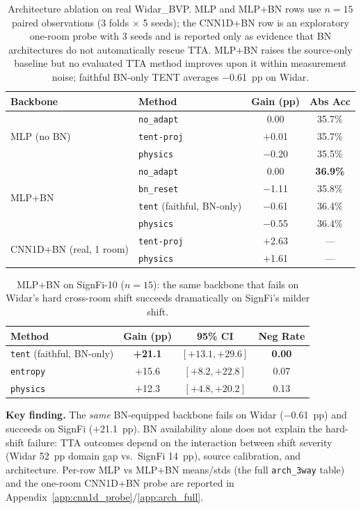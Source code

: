 \begin{table}[h]
\centering
\caption{Architecture ablation on real Widar\_BVP. MLP and MLP+BN rows use $n{=}15$ paired observations (3 folds $\times$ 5 seeds); the CNN1D+BN row is an exploratory one-room probe with 3 seeds and is reported only as evidence that BN architectures do not automatically rescue TTA. MLP+BN raises the source-only baseline but no evaluated TTA method improves upon it within measurement noise; faithful BN-only TENT averages $-$0.61~pp on Widar.}
\label{tab:faithful_tent}
\small
\begin{tabular}{llcc}
\toprule
\textbf{Backbone} & \textbf{Method} & \textbf{Gain (pp)} & \textbf{Abs Acc} \\
\midrule
\multirow{3}{*}{MLP (no BN)} & \texttt{no\_adapt} & 0.00 & 35.7\% \\
 & \texttt{tent-proj} & $+$0.01 & 35.7\% \\
 & \texttt{physics} & $-$0.20 & 35.5\% \\
\midrule
\multirow{4}{*}{MLP+BN} & \texttt{no\_adapt} & 0.00 & \textbf{36.9\%} \\
 & \texttt{bn\_reset} & $-$1.11 & 35.8\% \\
 & \texttt{tent} (faithful, BN-only) & $-$0.61 & 36.4\% \\
 & \texttt{physics} & $-$0.55 & 36.4\% \\
\midrule
\multirow{2}{*}{CNN1D+BN (real, 1 room)} & \texttt{tent-proj} & $+$2.63 & --- \\
 & \texttt{physics} & $+$1.61 & --- \\
\bottomrule
\end{tabular}
\end{table}

\begin{table}[h]
\centering
\caption{MLP+BN on SignFi-10 ($n{=}15$): the same backbone that fails on Widar's hard cross-room shift succeeds dramatically on SignFi's milder shift.}
\label{tab:signfi_mlpbn}
\small
\begin{tabular}{lccc}
\toprule
\textbf{Method} & \textbf{Gain (pp)} & \textbf{95\% CI} & \textbf{Neg Rate} \\
\midrule
\texttt{tent} (faithful, BN-only) & \textbf{+21.1} & $[+13.1, +29.6]$ & \textbf{0.00} \\
\texttt{entropy} & $+$15.6 & $[+8.2, +22.8]$ & 0.07 \\
\texttt{physics} & $+$12.3 & $[+4.8, +20.2]$ & 0.13 \\
\bottomrule
\end{tabular}
\end{table}

\textbf{Key finding.} The \emph{same} BN-equipped backbone fails on Widar ($-$0.61~pp) and succeeds on SignFi ($+$21.1~pp). BN availability alone does not explain the hard-shift failure: TTA outcomes depend on the interaction between shift severity (Widar 52~pp domain gap vs.\ SignFi 14~pp), source calibration, and architecture. Per-row MLP vs MLP+BN means/stds (the full \texttt{arch\_3way} table) and the one-room CNN1D+BN probe are reported in Appendix~\ref{app:cnn1d_probe}/\ref{app:arch_full}.
